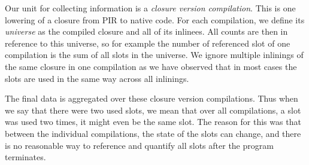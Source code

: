 Our unit for collecting information is a \textit{closure version compilation}. This is one lowering of a closure from PIR to native code. For each compilation, we define its \textit{universe} as the compiled closure and all of its inlinees. All counts are then in reference to this universe, so for example the number of referenced slot of one compilation is the sum of all slots in the universe. We ignore multiple inlinings of the same closure in one compilation as we have observed that in most cases the slots are used in the same way across all inlinings.

The final data is aggregated over these closure version compilations. Thus when we say that there were two used slots, we mean that over all compilations, a slot was used two times, it might even be the same slot. The reason for this was that between the individual compilations, the state of the slots can change, and there is no reasonable way to reference and quantify all slots after the program terminates.


